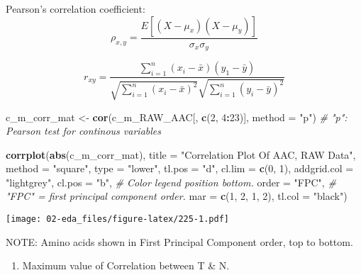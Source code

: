 \documentclass[]{article}
\newenvironment{Shaded}{\begin{snugshade}}{\end{snugshade}}
\newcommand{\CommentTok}[1]{\textcolor[rgb]{0.56,0.35,0.01}{\textit{#1}}}
\newcommand{\DataTypeTok}[1]{\textcolor[rgb]{0.13,0.29,0.53}{#1}}
\newcommand{\DecValTok}[1]{\textcolor[rgb]{0.00,0.00,0.81}{#1}}
\newcommand{\KeywordTok}[1]{\textcolor[rgb]{0.13,0.29,0.53}{\textbf{#1}}}
\newcommand{\NormalTok}[1]{#1}
\newcommand{\OperatorTok}[1]{\textcolor[rgb]{0.81,0.36,0.00}{\textbf{#1}}}
\newcommand{\StringTok}[1]{\textcolor[rgb]{0.31,0.60,0.02}{#1}}
\providecommand{\tightlist}{%
  \setlength{\itemsep}{0pt}\setlength{\parskip}{0pt}}
\begin{document}
Pearson's correlation coefficient: \begin{equation} 
\rho_{x,y} = \frac {E \left[(X - \mu_x)(X - \mu_y) \right]} {\sigma_x \sigma_y}
\end{equation}

\begin{equation} 
r_{xy} = \frac {\sum^n_{i=1} (x_i - \bar x)(y_1 - \bar y)} { {\sqrt {\sum^n_{i=1} (x_i - \bar x)^2 }} {\sqrt {\sum^n_{i=1} (y_i - \bar y)^2 }} }
\end{equation}

\begin{Shaded}
\begin{Highlighting}[]
\NormalTok{c_m_corr_mat <-}\StringTok{ }\KeywordTok{cor}\NormalTok{(c_m_RAW_AAC[, }\KeywordTok{c}\NormalTok{(}\DecValTok{2}\NormalTok{, }\DecValTok{4}\OperatorTok{:}\DecValTok{23}\NormalTok{)], }\DataTypeTok{method =} \StringTok{"p"}\NormalTok{) }\CommentTok{# "p": Pearson test for continous variables}

\KeywordTok{corrplot}\NormalTok{(}\KeywordTok{abs}\NormalTok{(c_m_corr_mat),}
         \DataTypeTok{title =} \StringTok{"Correlation Plot Of AAC, RAW Data"}\NormalTok{,}
         \DataTypeTok{method =} \StringTok{"square"}\NormalTok{,}
         \DataTypeTok{type =} \StringTok{"lower"}\NormalTok{,}
         \DataTypeTok{tl.pos =} \StringTok{"d"}\NormalTok{,}
         \DataTypeTok{cl.lim =} \KeywordTok{c}\NormalTok{(}\DecValTok{0}\NormalTok{, }\DecValTok{1}\NormalTok{),}
         \DataTypeTok{addgrid.col =} \StringTok{"lightgrey"}\NormalTok{,}
         \DataTypeTok{cl.pos =} \StringTok{"b"}\NormalTok{,                   }\CommentTok{# Color legend position bottom.}
         \DataTypeTok{order =} \StringTok{"FPC"}\NormalTok{,                  }\CommentTok{# "FPC" = first principal component order.}
         \DataTypeTok{mar =} \KeywordTok{c}\NormalTok{(}\DecValTok{1}\NormalTok{, }\DecValTok{2}\NormalTok{, }\DecValTok{1}\NormalTok{, }\DecValTok{2}\NormalTok{),}
         \DataTypeTok{tl.col =} \StringTok{"black"}\NormalTok{)}
\end{Highlighting}
\end{Shaded}

\texttt{[image: 02-eda\_files/figure-latex/225-1.pdf]}

NOTE: Amino acids shown in First Principal Component order, top to
bottom.

\begin{enumerate}
\def\labelenumi{\arabic{enumi}.}
\tightlist
\item
  Maximum value of Correlation between T \& N.
\end{enumerate}
\end{document}
